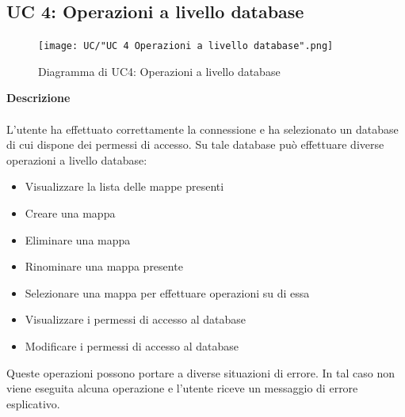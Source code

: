 \documentclass[a4paper]{article}
\begin{document}
		 
		 \subsection{UC 4: Operazioni a livello database}
	 \begin{figure}[H]
				\centering
				\texttt{[image: UC/"UC 4 Operazioni a livello database".png]}
				\caption{Diagramma di UC4: Operazioni a livello database}
			\end{figure}
	\textbf{Descrizione} 
	\\ \\
	L'utente ha effettuato correttamente la connessione e ha selezionato un database di cui dispone dei permessi di accesso. Su tale database può effettuare diverse operazioni a livello database:
	\begin{itemize}
	\item Visualizzare la lista delle mappe presenti
	\item Creare una mappa
	\item Eliminare una mappa
	\item Rinominare una mappa presente
	\item Selezionare una mappa per effettuare operazioni su di essa
	\item Visualizzare i permessi di accesso al database
	\item Modificare i permessi di accesso al database
	\end{itemize}
	Queste operazioni possono portare a diverse situazioni di errore. In tal caso non viene eseguita alcuna operazione e l'utente riceve un messaggio di errore esplicativo. 
\end{document}
